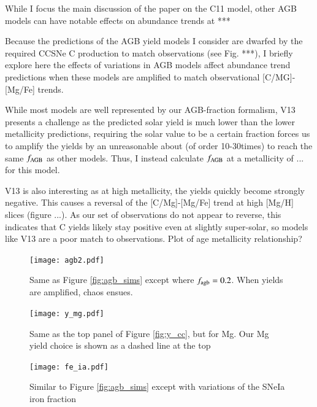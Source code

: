 \documentclass[12pt,oneside]{report}
\begin{document}
While I focus the main discussion of the paper on the C11 model, other AGB models can have notable effects on abundance trends at ***

Because the predictions of the AGB yield models I consider are dwarfed by the
required CCSNe C production to match observations (see Fig. ***), I briefly explore here the effects of variations in AGB models affect abundance trend predictions when these models are amplified to match observational [C/MG]-[Mg/Fe] trends. 

While most models are well represented by our AGB-fraction formalism, V13 presents a challenge as the predicted solar yield is much lower than the lower metallicity predictions, requiring the solar value to be a certain fraction forces us to amplify the yields by an unreasonable about (of order 10-30times) to reach the same $f_{\rm AGB}$ as other models. Thus, I instead calculate $f_{\rm AGB}$ at a metallicity of ... for this model. 

V13 is also interesting as at high metallicity, the yields quickly become strongly negative. This causes a reversal of the [C/Mg]-[Mg/Fe] trend at high [Mg/H] slices (figure ...). As our set of observations do not appear to reverse, this indicates that C yields likely stay positive even at slightly super-solar, so models like V13 are a poor match to observations. 
Plot of age metallicity relationship?


\begin{figure}[htp]
    \centering
    \texttt{[image: agb2.pdf]}

    \caption[Alternate AGB models]{Same as Figure \ref{fig:agb_sims} except where $f_{\rm agb}=0.2$. When yields are amplified, chaos ensues.}
\end{figure}


\begin{figure}
    \centering
    \texttt{[image: y\_mg.pdf]}
    \caption[Magnesium CCSNe yields]{Same as the top panel of Figure \ref{fig:y_cc}, but for Mg. Our Mg yield choice is shown as a dashed line at the top
    }
\end{figure}

\begin{figure}
    \centering
    \texttt{[image: fe\_ia.pdf]}
    \caption[Adjusting type Ia iron]{Similar to Figure \ref{fig:agb_sims} except with variations of the SNeIa iron fraction}
\end{figure}




\label{lastpage}
\end{document}
